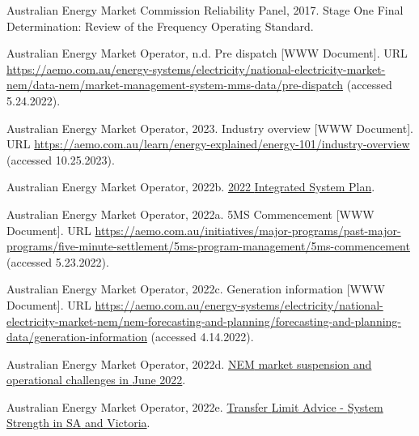 \documentclass[12pt,a4paper,]{report}
\newlength{\cslhangindent}
\newenvironment{CSLReferences}[2] %
 {%
  \setlength{\parindent}{0pt}
  \ifodd #1 \everypar{\setlength{\hangindent}{\cslhangindent}}\ignorespaces\fi
  \ifnum #2 > 0
  \setlength{\parskip}{#2\baselineskip}
  \fi
 }%
 {}
\begin{document}
\begin{CSLReferences}{1}{0}
\leavevmode{}%
Australian Energy Market Commission Reliability Panel, 2017. Stage {One
Final Determination}: {Review} of the {Frequency Operating Standard}.

\leavevmode{}%
Australian Energy Market Operator, n.d. Pre dispatch {[}WWW Document{]}.
URL
\url{https://aemo.com.au/energy-systems/electricity/national-electricity-market-nem/data-nem/market-management-system-mms-data/pre-dispatch}
(accessed 5.24.2022).

\leavevmode{}%
Australian Energy Market Operator, 2023. Industry overview {[}WWW
Document{]}. URL
\url{https://aemo.com.au/learn/energy-explained/energy-101/industry-overview}
(accessed 10.25.2023).

\leavevmode{}%
Australian Energy Market Operator, 2022b.
\href{https://aemo.com.au/-/media/files/major-publications/isp/2022/2022-documents/2022-integrated-system-plan-isp.pdf?la=en}{2022
{Integrated System Plan}}.

\leavevmode{}%
Australian Energy Market Operator, 2022a. {5MS Commencement} {[}WWW
Document{]}. URL
\url{https://aemo.com.au/initiatives/major-programs/past-major-programs/five-minute-settlement/5ms-program-management/5ms-commencement}
(accessed 5.23.2022).

\leavevmode{}%
Australian Energy Market Operator, 2022c. Generation information {[}WWW
Document{]}. URL
\url{https://aemo.com.au/energy-systems/electricity/national-electricity-market-nem/nem-forecasting-and-planning/forecasting-and-planning-data/generation-information}
(accessed 4.14.2022).

\leavevmode{}%
Australian Energy Market Operator, 2022d.
\href{https://aemo.com.au/-/media/files/electricity/nem/market_notices_and_events/market_event_reports/2022/nem-market-suspension-and-operational-challenges-in-june-2022.pdf?la=en}{{NEM}
market suspension and operational challenges in {June} 2022}.

\leavevmode{}%
Australian Energy Market Operator, 2022e.
\href{https://www.aemo.com.au/-/media/files/electricity/nem/security_and_reliability/congestion-information/transfer-limit-advice-system-strength.pdf?la=en}{Transfer
{Limit Advice} - {System Strength} in {SA} and {Victoria}}.


\end{CSLReferences}
\end{document}
